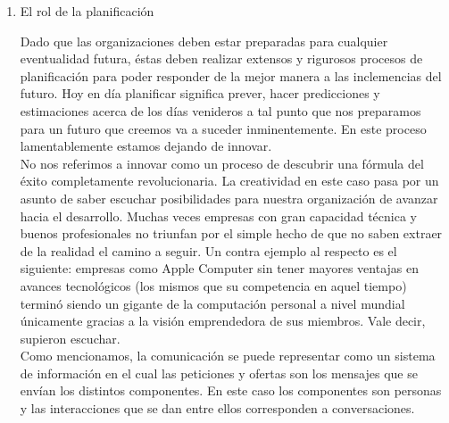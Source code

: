 \begin{enumerate}
Al hacerse la petici\'on con su correspondiente promesa, aparece lo que
denominamos ``condiciones de satisfacci\'on'', que no es otra cosa que las
condiciones bajo las que se cumplir\'a una petici\'on o una promesa.
En lo que va del texto ya hemos profundizado dos grandes conceptos
que son posibles distinguir en las conversaciones para la acci\'on. Ahora se
ver\'an otros dos conceptos: las afirmaciones y las declaraciones.\\

Con una afirmaci\'on se dice que algo es as\'i o verdadero, una declaraci\'on,
por el contrario, no es decir que algo es as\'i: es hacer que sea as\'i. Las
conversaciones para la acci\'on comprometen a actuar; en cambio las conversaciones
 para posibilidades producen oportunidades para comprometerse en una acci\'on.\\

	\item El rol de la planificaci\'on

Dado que las organizaciones deben estar preparadas para cualquier eventualidad futura, \'estas
deben realizar extensos y rigurosos procesos de planificaci\'on para poder responder de la mejor
manera a las inclemencias del futuro. Hoy en d\'ia planificar significa prever, hacer predicciones y
estimaciones acerca de los d\'ias venideros a tal punto que nos preparamos para un futuro que creemos
va a suceder inminentemente. En este proceso lamentablemente estamos dejando de innovar.\\

No nos referimos a innovar como un proceso de descubrir una f\'ormula del \'exito completamente
revolucionaria. La creatividad en este caso pasa por un asunto de saber escuchar posibilidades
para nuestra organizaci\'on de avanzar hacia el desarrollo. Muchas veces empresas con gran
capacidad t\'ecnica y buenos profesionales no triunfan por el simple hecho de que no saben extraer
de la realidad el camino a seguir. Un contra ejemplo al respecto es el siguiente: empresas como
Apple Computer sin tener mayores ventajas en avances tecnol\'ogicos (los mismos que su competencia
en aquel tiempo) termin\'o siendo un gigante de la computaci\'on personal a nivel mundial \'unicamente
gracias a la visi\'on emprendedora de sus miembros. Vale decir, supieron escuchar.\\

Como mencionamos, la comunicaci\'on se puede representar como un sistema de informaci\'on
en el cual las peticiones y ofertas son los mensajes que se env\'ian los distintos componentes. En
este caso los componentes son personas y las interacciones que se dan entre ellos corresponden a
conversaciones.



\end{enumerate}
\vspace{8cm}
